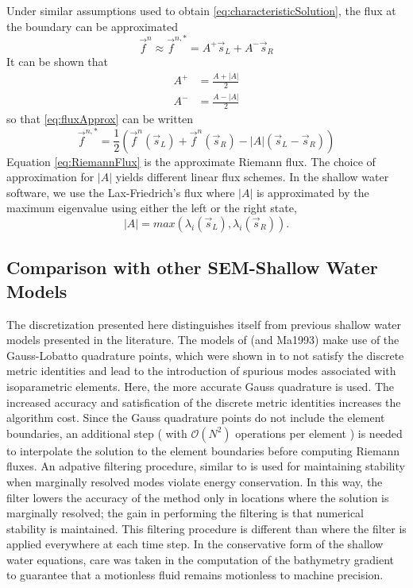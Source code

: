 \documentclass{softwaremanual}
\begin{document}
Under similar assumptions used to obtain \eqref{eq:characteristicSolution}, the flux at the boundary can be approximated
\begin{equation}
\vec{f}^n \approx \vec{f}^{n,*} = A^{+}\vec{s}_L + A^{-}\vec{s}_R  \label{eq:fluxApprox}
\end{equation}
It can be shown that
\begin{subequations}
\begin{align}
A^{+} &= \frac{A+|A|}{2} \\
A^{-} &= \frac{A-|A|}{2}
\end{align}
\end{subequations}
so that \eqref{eq:fluxApprox} can be written
\begin{equation}
\vec{f}^{n,*} = \frac{1}{2}\left( \vec{f}^n(\vec{s}_L) + \vec{f}^n(\vec{s}_R) -|A|(\vec{s}_L - \vec{s}_R) \right)\label{eq:RiemannFlux}
\end{equation}
Equation \eqref{eq:RiemannFlux} is the approximate Riemann flux. The choice of approximation for $|A|$ yields different linear flux schemes. In the shallow water software, we use the Lax-Friedrich's flux where $|A|$ is approximated by the maximum eigenvalue using either the left or the right state,
\begin{equation}
|A| = max( \lambda_i(\vec{s}_L), \lambda_i(\vec{s}_R) ).
\end{equation}


\subsection{Comparison with other SEM-Shallow Water Models}
The discretization presented here distinguishes itself from previous shallow water models presented in the literature. The models of \citet{Iskandarani1995} (and Ma1993) make use of the Gauss-Lobatto quadrature points, which were shown in \citet{Kopriva2006} to not satisfy the discrete metric identities and lead to the introduction of spurious modes associated with isoparametric elements. Here, the more accurate Gauss quadrature is used. The increased accuracy and satisfication of the discrete metric identities increases the algorithm cost. Since the Gauss quadrature points do not include the element boundaries, an additional step ( with $\mathcal{O}(N^2)$ operations per element ) is needed to interpolate the solution to the element boundaries before computing Riemann fluxes. An adpative filtering procedure, similar to \citet{Flad2016} is used for maintaining stability when marginally resolved modes violate energy conservation. In this way, the filter lowers the accuracy of the method only in locations where the solution is marginally resolved; the gain in performing the filtering is that numerical stability is maintained. This filtering procedure is different than \citet{Taylor1997} where the filter is applied everywhere at each time step. In the conservative form of the shallow water equations, care was taken in the computation of the bathymetry gradient to guarantee that a motionless fluid remains motionless to machine precision.
\end{document}
